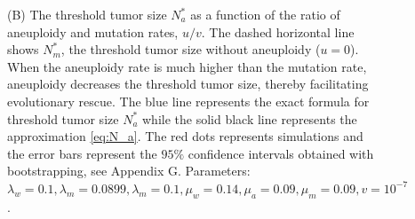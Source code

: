 \documentclass[12pt]{extarticle}
\begin{document}
\begin{figure}
{(B) The threshold tumor size $N_a^*$ as a function of the ratio of aneuploidy and mutation rates, $u/v$. The dashed horizontal line shows $N^*_m$, the threshold tumor size without aneuploidy ($u=0$). When the aneuploidy rate is much higher than the mutation rate, aneuploidy decreases the threshold tumor size, thereby facilitating evolutionary rescue. The blue line represents the exact formula for threshold tumor size $N_a^*$ while the solid black line represents the approximation \cref{eq:N_a}. The red dots represents simulations and the error bars represent the $95\%$ confidence intervals obtained with bootstrapping, see Appendix G.  Parameters: $\lambda_w=0.1,\lambda_m=0.0899,\lambda_m=0.1,\mu_w=0.14,\mu_a=0.09,\mu_m=0.09, v=10^{-7}$. 
}
\label{rescue_threshold}
\end{figure}

\end{document}
